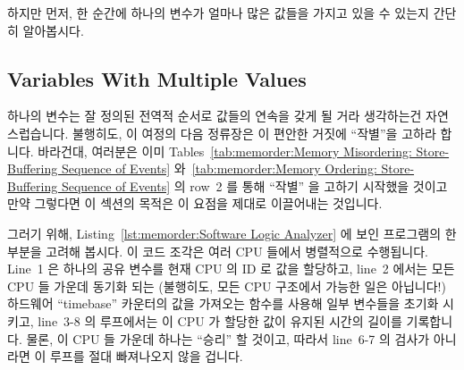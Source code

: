 하지만 먼저, 한 순간에 하나의 변수가 얼마나 많은 값들을 가지고 있을 수 있는지
간단히 알아봅시다.

\subsection{Variables With Multiple Values}
\label{sec:memorder:Variables With Multiple Values}

하나의 변수는 잘 정의된 전역적 순서로 값들의 연속을 갖게 될 거라 생각하는건
자연스럽습니다.
불행히도, 이 여정의 다음 정류장은 이 편안한 거짓에 ``작별''을 고하라 합니다.
바라건대, 여러분은 이미
Tables~\ref{tab:memorder:Memory Misordering: Store-Buffering Sequence of Events}
와~\ref{tab:memorder:Memory Ordering: Store-Buffering Sequence of Events} 의
row~2 를 통해 ``작별'' 을 고하기 시작했을 것이고 만약 그렇다면 이 섹션의 목적은
이 요점을 제대로 이끌어내는 것입니다.

그러기 위해,
Listing~\ref{lst:memorder:Software Logic Analyzer} 에 보인 프로그램의 한 부분을
고려해 봅시다.
이 코드 조각은 여러 CPU 들에서 병렬적으로 수행됩니다.
Line~1 은 하나의 공유 변수를 현재 CPU 의 ID 로 값을 할당하고, line~2 에서는
모든 CPU 들 가운데 동기화 되는 (불행히도, 모든 CPU 구조에서 가능한 일은
아닙니다!) 하드웨어 ``timebase'' 카운터의 값을 가져오는  함수를
사용해 일부 변수들을 초기화 시키고, line~3-8 의 루프에서는 이 CPU 가 할당한
값이 유지된 시간의 길이를 기록합니다.
물론, 이 CPU 들 가운데 하나는 ``승리'' 할 것이고, 따라서 line~6-7 의 검사가
아니라면 이 루프를 절대 빠져나오지 않을 겁니다.
\iffalse

